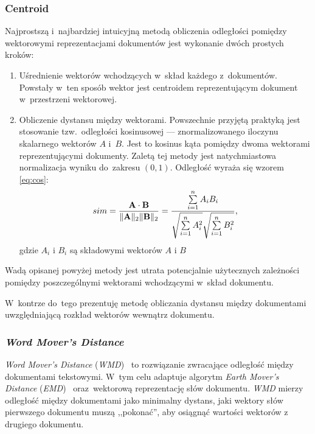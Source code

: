 \documentclass[pl]{minipw} %
\begin{document}
\subsubsection{Centroid}
Najprostszą i~najbardziej intuicyjną metodą obliczenia odległości pomiędzy wektorowymi reprezentacjami dokumentów jest wykonanie dwóch prostych kroków:
\begin{enumerate}
	\item Uśrednienie wektorów wchodzących w~skład każdego z~dokumentów. Powstały w~ten sposób wektor jest centroidem reprezentującym dokument w~przestrzeni wektorowej.
	\item Obliczenie dystansu między wektorami. Powszechnie przyjętą praktyką jest stosowanie tzw.~odległości kosinusowej --- znormalizowanego iloczynu skalarnego wektorów $A$ i~$B$. Jest to kosinus kąta pomiędzy dwoma wektorami reprezentującymi dokumenty. Zaletą tej metody jest natychmiastowa normalizacja wyniku do~zakresu $(0, 1)$. Odległość wyraża się wzorem \ref{eq:cos}:
	\begin{equation}
	\label{eq:cos}
	sim={\mathbf {A} \cdot \mathbf {B}  \over \|\mathbf {A} \|_{2}\|\mathbf {B} \|_{2}}={\frac {\sum \limits _{i=1}^{n}{A_{i}B_{i}}}{{\sqrt {\sum \limits _{i=1}^{n}{A_{i}^{2}}}}{\sqrt {\sum \limits _{i=1}^{n}{B_{i}^{2}}}}}},
	\end{equation}
	gdzie $A_i$ i $B_i$ są składowymi wektorów $A$ i $B$
\end{enumerate}
Wadą opisanej powyżej metody jest utrata potencjalnie użytecznych zależności pomiędzy poszczególnymi wektorami wchodzącymi w~skład dokumentu.

W~kontrze do~tego prezentuję metodę obliczania dystansu między dokumentami uwzględniającą rozkład wektorów wewnątrz dokumentu.

\subsubsection{\textit{Word Mover's Distance}}
\textit{Word Mover's Distance} (\textit{WMD})~\cite{wmd} to rozwiązanie zwracające odległość między dokumentami tekstowymi. W~tym celu adaptuje algorytm \textit{Earth Mover's Distance} (\textit{EMD})~\cite{emd} oraz~wektorową reprezentację słów dokumentu. \textit{WMD} mierzy odległość między dokumentami jako minimalny dystans, jaki wektory słów pierwszego dokumentu muszą ,,pokonać'', aby osiągnąć wartości wektorów z drugiego dokumentu.
\end{document}
